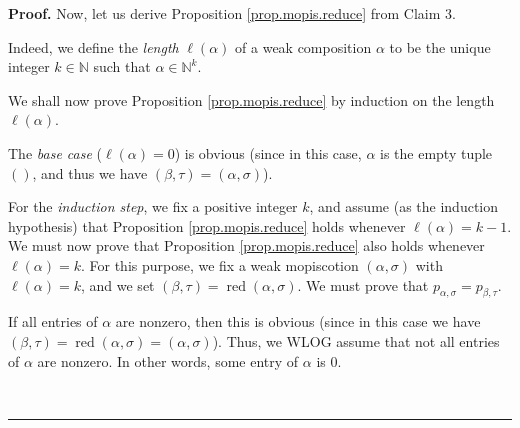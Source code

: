 \documentclass[numbers=enddot,12pt,final,onecolumn,notitlepage]{scrartcl}%
\theoremstyle{definition}
\newenvironment{fineprint}{\begin{small}}{\end{small}}
\newenvironment{proof}[1][Proof]{\noindent\textbf{#1.} }{\ \rule{0.5em}{0.5em}}
\begin{document}
\begin{fineprint}
\begin{proof}
Now, let us derive Proposition \ref{prop.mopis.reduce} from Claim 3.

Indeed, we define the \emph{length} $\ell\left(  \alpha\right)  $ of a weak
composition $\alpha$ to be the unique integer $k\in\mathbb{N}$ such that
$\alpha\in\mathbb{N}^{k}$.

We shall now prove Proposition \ref{prop.mopis.reduce} by induction on the
length $\ell\left(  \alpha\right)  $.

The \textit{base case} ($\ell\left(  \alpha\right)  =0$) is obvious (since in
this case, $\alpha$ is the empty tuple $\left(  {}\right)  $, and thus we have
$\left(  \beta,\tau\right)  =\left(  \alpha,\sigma\right)  $).

For the \textit{induction step}, we fix a positive integer $k$, and assume (as
the induction hypothesis) that Proposition \ref{prop.mopis.reduce} holds
whenever $\ell\left(  \alpha\right)  =k-1$. We must now prove that Proposition
\ref{prop.mopis.reduce} also holds whenever $\ell\left(  \alpha\right)  =k$.
For this purpose, we fix a weak mopiscotion $\left(  \alpha,\sigma\right)  $
with $\ell\left(  \alpha\right)  =k$, and we set $\left(  \beta,\tau\right)
=\operatorname*{red}\left(  \alpha,\sigma\right)  $. We must prove that
$p_{\alpha,\sigma}=p_{\beta,\tau}$.

If all entries of $\alpha$ are nonzero, then this is obvious (since in this
case we have $\left(  \beta,\tau\right)  =\operatorname*{red}\left(
\alpha,\sigma\right)  =\left(  \alpha,\sigma\right)  $). Thus, we WLOG assume
that not all entries of $\alpha$ are nonzero. In other words, some entry of
$\alpha$ is $0$.


\end{proof}
\end{fineprint}
\end{document}
